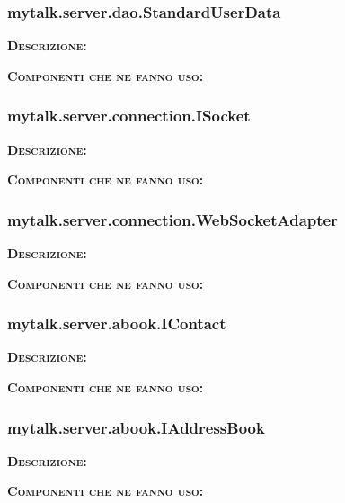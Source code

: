 \subsubsection{mytalk.server.dao.StandardUserData}
\begin{description}
	\item{\scshape\bfseries Descrizione:} 
	\item{\scshape\bfseries Componenti che ne fanno uso:} 
\end{description}

\subsubsection{mytalk.server.connection.ISocket}
\begin{description}
	\item{\scshape\bfseries Descrizione:} 
	\item{\scshape\bfseries Componenti che ne fanno uso:} 
\end{description}

\subsubsection{mytalk.server.connection.WebSocketAdapter}
\begin{description}
	\item{\scshape\bfseries Descrizione:} 
	\item{\scshape\bfseries Componenti che ne fanno uso:} 
\end{description}

\subsubsection{mytalk.server.abook.IContact}
\begin{description}
	\item{\scshape\bfseries Descrizione:} 
	\item{\scshape\bfseries Componenti che ne fanno uso:} 
\end{description}

\subsubsection{mytalk.server.abook.IAddressBook}
\begin{description}
	\item{\scshape\bfseries Descrizione:} 
	\item{\scshape\bfseries Componenti che ne fanno uso:} 
\end{description}

